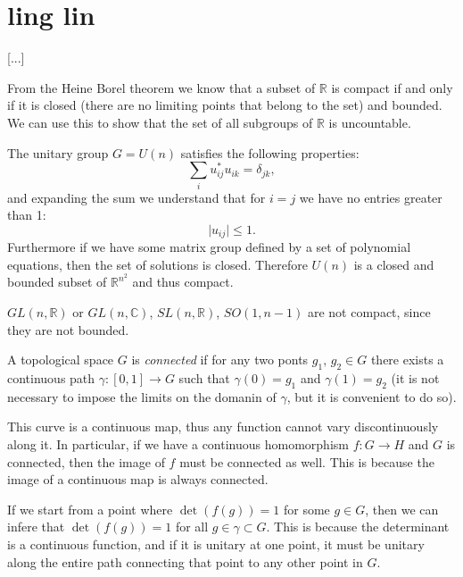 \chapter{ling lin}

 [...]

From the Heine Borel theorem we know that a subset of $\mathbb{R}$ is compact if and only if it is closed (there are no limiting points that belong to the set) and bounded. We can use this to show that the set of all subgroups of $\mathbb{R}$ is uncountable.

\begin{example}
    The unitary group \(G = U(n)\) satisfies the following properties:
    \[
        \sum_{i} u^*_{ij} u_{ik} = \delta_{jk},
    \]
    and expanding the sum we understand that for \(i=j\) we have no entries greater than 1:
    \[
        \vert u_{ij} \vert \leq 1.
    \]
    Furthermore if we have some matrix group defined by a set of polynomial equations, then the set of solutions is closed. Therefore \(U(n)\) is a closed and bounded subset of \(\mathbb{R}^{n^2}\) and thus compact.
\end{example}

\begin{example}
    \(GL(n,\mathbb{R})\) or \(GL(n,\mathbb{C})\), \(SL(n,\mathbb{R})\), \(SO(1,n-1)\) are not compact, since they are not bounded.
\end{example}

\begin{definition}[Connectedness]
    A topological space \(G\) is \textit{connected} if for any two ponts \(g_1,\,g_2 \in G\) there exists a continuous path \(\gamma : [0,1] \to G\) such that \(\gamma(0) = g_1\) and \(\gamma(1) = g_2\) (it is not necessary to impose the limits on the domanin of \(\gamma\), but it is convenient to do so).
\end{definition}

This curve is a continuous map, thus any function cannot vary discontinuously along it. In particular, if we have a continuous homomorphism \(f : G \to H\) and \(G\) is connected, then the image of \(f\) must be connected as well. This is because the image of a continuous map is always connected.

If we start from a point where \(\det(f(g)) = 1\) for some \(g \in G\), then we can infere that \(\det(f(g)) = 1\) for all \(g \in \gamma \subset G\). This is because the determinant is a continuous function, and if it is unitary at one point, it must be unitary along the entire path connecting that point to any other point in \(G\).


